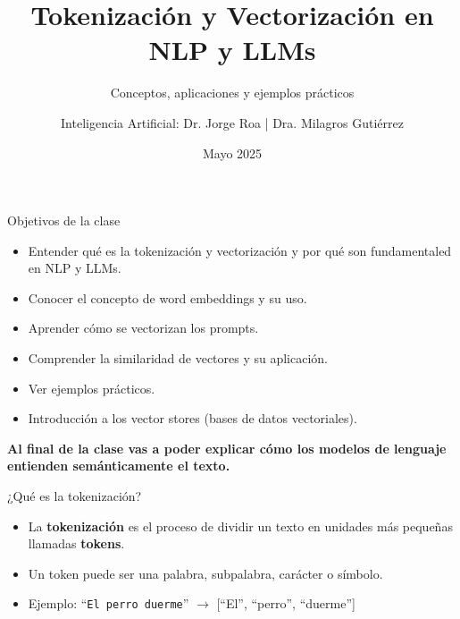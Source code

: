 \documentclass[aspectratio=169,xcolor=dvipsnames, t]{beamer}
\title[Vectorization]{Tokenización y Vectorización en NLP y LLMs}
\subtitle{Conceptos, aplicaciones y ejemplos prácticos}
\author[Jorge]{ Inteligencia Artificial: Dr. Jorge Roa | Dra. Milagros Gutiérrez}
\institute[CIDISI]{CIDISI - UTN - FRSF}
\date{Mayo 2025}
\begin{document}
\maketitlepage


\begin{frame}{Objetivos de la clase}
    \begin{itemize}
        \item Entender qué es la tokenización y vectorización y por qué son fundamentaled en NLP y LLMs.
        \item Conocer el concepto de word embeddings y su uso.
        \item Aprender cómo se vectorizan los prompts.
        \item Comprender la similaridad de vectores y su aplicación.
        \item Ver ejemplos prácticos.
        \item Introducción a los vector stores (bases de datos vectoriales).
    \end{itemize}
    \vspace{0.5cm}
    \textbf{Al final de la clase vas a poder explicar cómo los modelos de lenguaje entienden semánticamente el texto.}
\end{frame}

\begin{frame}{¿Qué es la tokenización?}
    \begin{itemize}
        \item La \textbf{tokenización} es el proceso de dividir un texto en unidades más pequeñas llamadas \textbf{tokens}.
        \item Un token puede ser una palabra, subpalabra, carácter o símbolo.
        \item Ejemplo: ``\texttt{El perro duerme}'' $\rightarrow$ [``El'', ``perro'', ``duerme'']
    \end{itemize}
    \vspace{0.3cm}

\end{frame}

\end{document}

